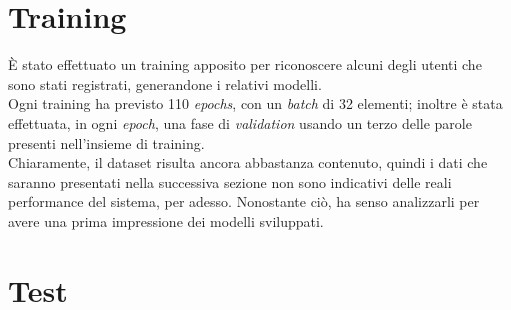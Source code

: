 \documentclass[8pt,notitlepage]{report}
\begin{document}
	\section{Training}
		È stato effettuato un training apposito per riconoscere alcuni degli utenti che sono stati registrati, generandone i relativi modelli. \\ 
		Ogni training ha previsto 110 \textit{epochs}, con un \textit{batch} di 32 elementi; inoltre è stata effettuata, in ogni \textit{epoch}, una fase di \textit{validation} usando un terzo delle parole presenti nell'insieme di training. \\
		Chiaramente, il dataset risulta ancora abbastanza contenuto, quindi i dati che saranno presentati nella successiva sezione non sono indicativi delle reali performance del sistema, per adesso. Nonostante ciò, ha senso analizzarli per avere una prima impressione dei modelli sviluppati.
		
	\section{Test}
		
\end{document}
